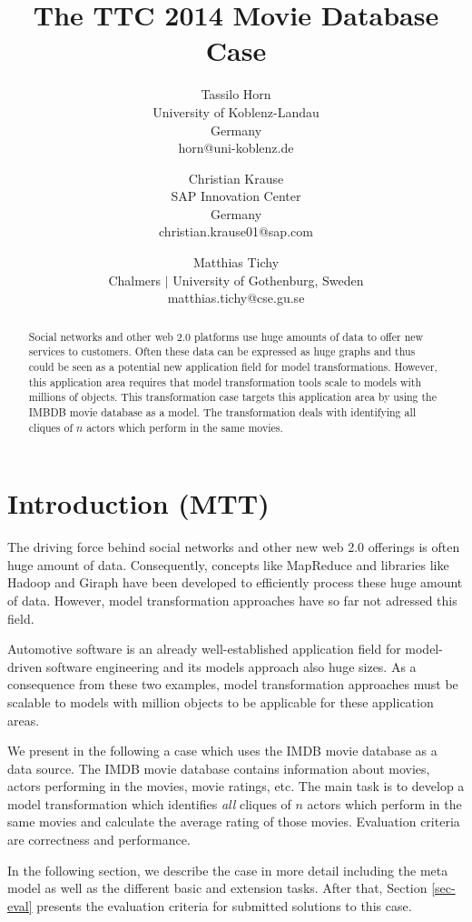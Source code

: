 \documentclass[a4paper,11pt]{article}
\title{The TTC 2014 Movie Database Case}
\author{
Tassilo Horn\\ University of Koblenz-Landau\\ Germany\\ horn@uni-koblenz.de
\and
Christian Krause\\ SAP Innovation Center\\ Germany\\ christian.krause01@sap.com
\and
Matthias Tichy\\ Chalmers $|$ University of Gothenburg, Sweden \\matthias.tichy@cse.gu.se
}
\begin{document}
\maketitle

\begin{abstract}
  Social networks and other web 2.0 platforms use huge amounts of data
  to offer new services to customers. Often these data can be
  expressed as huge graphs and thus could be seen as a potential new
  application field for model transformations. However, this
  application area requires that model transformation tools scale to
  models with millions of objects. This transformation case targets
  this application area by using the IMBDB movie database as a
  model. The transformation deals with identifying all cliques of $n$
  actors which perform in the same movies.
  \end{abstract}
\vskip 32pt


\section{Introduction (MTT)}

The driving force behind social networks and other new web 2.0
offerings is often huge amount of data. Consequently, concepts like
MapReduce \cite{Dean08} and libraries like Hadoop \cite{Hadoop} and
Giraph \cite{Giraph} have been developed to efficiently process these
huge amount of data. However, model transformation approaches have so
far not adressed this field.

Automotive software is an already well-established application field
for model-driven software engineering and its models approach also
huge sizes. As a consequence from these two examples, model
transformation approaches must be scalable to models with million
objects to be applicable for these application areas.

We present in the following a case which uses the IMDB movie database
\cite{IMDBDATA} as a data source. The IMDB movie database contains
information about movies, actors performing in the movies, movie
ratings, etc. The main task is to develop a model transformation which
identifies \emph{all} cliques of $n$ actors which perform in the same
movies and calculate the average rating of those movies. Evaluation
criteria are correctness and performance.

In the following section, we describe the case in more detail
including the meta model as well as the different basic and extension
tasks. After that, Section \ref{sec-eval} presents the evaluation
criteria for submitted solutions to this case.
\end{document}
